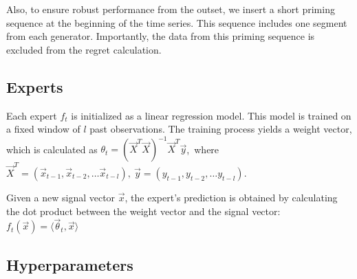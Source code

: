 \documentclass[12pt, twoside]{article}
\begin{document}
Also, to ensure robust performance from the outset, we insert a short priming sequence at the beginning of the time series. This sequence includes one segment from each generator. Importantly, the data from this priming sequence is excluded from the regret calculation.
\subsection{Experts}

Each expert $f_t$ is initialized as a linear regression model. 
This model is trained on a fixed window of $l$ past observations. 
The training process yields a weight vector, which is calculated as  
$\theta_t = (\vec X^T\vec X)^{-1}\vec X^T\vec y$,\ where $\vec X^T = (\vec x_{t-1}, \vec x_{t-2}, \dots \vec x_{t-l}),\ \vec y = (y_{t-1}, y_{t-2}, \dots y_{t-l})$. 

Given a new signal vector  $\vec x$, the expert's prediction is obtained by calculating the dot product between the weight vector and the signal vector: $f_t(\vec x) = \langle \vec \theta_t, \vec x \rangle$ 




\subsection{Hyperparameters}
\end{document}
